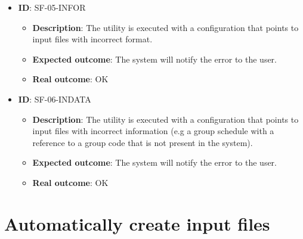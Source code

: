 \begin{itemize}
\begin{itemize}
        \end{itemize}
    \item \textbf{ID}: SF-05-INFOR
        \begin{itemize}
            \item \textbf{Description}: The utility is executed with a configuration that points to input files with incorrect format.
            \item \textbf{Expected outcome}: The system will notify the error to the user.
            \item \textbf{Real outcome}: OK
        \end{itemize}
    \item \textbf{ID}: SF-06-INDATA
        \begin{itemize}
            \item \textbf{Description}: The utility is executed with a configuration that points to input files with incorrect information (e.g a group schedule with a reference to a group code that is not present in the system).
            \item \textbf{Expected outcome}: The system will notify the error to the user.
            \item \textbf{Real outcome}: OK
        \end{itemize}
\end{itemize}



\section{Automatically create input files}

